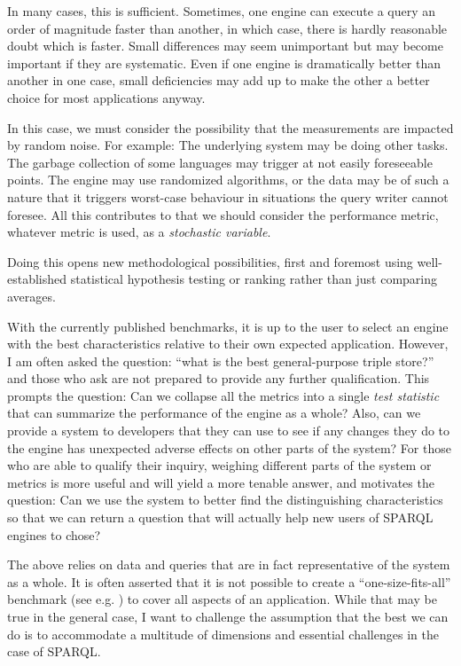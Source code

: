 \documentclass{llncs}
\begin{document}
In many cases, this is sufficient. Sometimes, one engine can execute a
query an order of magnitude faster than another, in which case, there
is hardly reasonable doubt which is faster. Small differences may seem
unimportant but may become important if they are systematic. Even if
one engine is dramatically better than another in one case, small
deficiencies may add up to make the other a better choice for most
applications anyway.

In this case, we must consider the possibility that the measurements
are impacted by random noise. For example: The underlying system may
be doing other tasks. The garbage collection of some languages may
trigger at not easily foreseeable points. The engine may use
randomized algorithms, or the data may be of such a nature that it
triggers worst-case behaviour in situations the query writer cannot
foresee. All this contributes to that we should consider the
performance metric, whatever metric is used, as a \emph{stochastic
  variable}.

Doing this opens new methodological possibilities, first and foremost
using well-established statistical hypothesis testing or ranking
rather than just comparing averages.

With the currently published benchmarks, it is up to the user to
select an engine with the best characteristics relative to their own
expected application. However, I am often asked the question: ``what
is the best general-purpose triple store?'' and those who ask are not
prepared to provide any further qualification. This prompts the
question: Can we collapse all the metrics into a single \emph{test
  statistic} that can summarize the performance of the engine as a
whole? Also, can we provide a system to developers that they can use
to see if any changes they do to the engine has unexpected adverse
effects on other parts of the system? For those who are able to
qualify their inquiry, weighing different parts of the system or
metrics is more useful and will yield a more tenable answer, and
motivates the question: Can we use the system to better find the
distinguishing characteristics so that we can return a question that
will actually help new users of SPARQL engines to chose? 

The above relies on data and queries that are in fact
representative of the system as a whole. It is often asserted that it
is not possible to create a ``one-size-fits-all'' benchmark (see
e.g. \cite{Schmidt:2011:FBS:2063016.2063054}) to cover all aspects of
an application. While that may be true in the general case, I want to
challenge the assumption that the best we can do is to accommodate a
multitude of dimensions and essential challenges in the case of
SPARQL.
\end{document}
